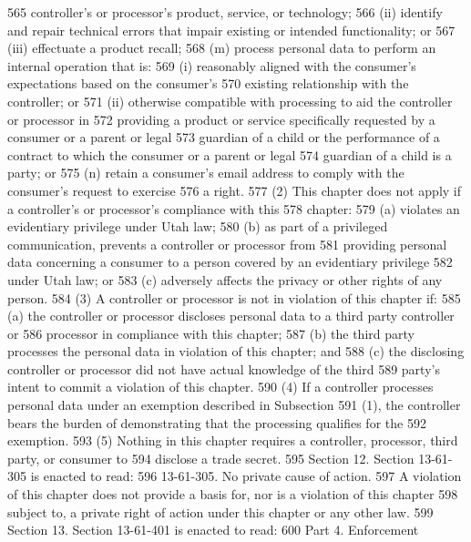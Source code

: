 565     controller's or processor's product, service, or technology;
566          (ii) identify and repair technical errors that impair existing or intended functionality; or
567          (iii) effectuate a product recall;
568          (m) process personal data to perform an internal operation that is:
569          (i) reasonably aligned with the consumer's expectations based on the consumer's
570     existing relationship with the controller; or
571          (ii) otherwise compatible with processing to aid the controller or processor in
572     providing a product or service specifically requested by a consumer or a parent or legal
573     guardian of a child or the performance of a contract to which the consumer or a parent or legal
574     guardian of a child is a party; or
575          (n) retain a consumer's email address to comply with the consumer's request to exercise
576     a right.
577          (2) This chapter does not apply if a controller's or processor's compliance with this
578     chapter:
579          (a) violates an evidentiary privilege under Utah law;
580          (b) as part of a privileged communication, prevents a controller or processor from
581     providing personal data concerning a consumer to a person covered by an evidentiary privilege
582     under Utah law; or
583          (c) adversely affects the privacy or other rights of any person.
584          (3) A controller or processor is not in violation of this chapter if:
585          (a) the controller or processor discloses personal data to a third party controller or
586     processor in compliance with this chapter;
587          (b) the third party processes the personal data in violation of this chapter; and
588          (c) the disclosing controller or processor did not have actual knowledge of the third
589     party's intent to commit a violation of this chapter.
590          (4) If a controller processes personal data under an exemption described in Subsection
591     (1), the controller bears the burden of demonstrating that the processing qualifies for the
592     exemption.
593          (5) Nothing in this chapter requires a controller, processor, third party, or consumer to
594     disclose a trade secret.
595          Section 12. Section 13-61-305 is enacted to read:
596          13-61-305. No private cause of action.
597          A violation of this chapter does not provide a basis for, nor is a violation of this chapter
598     subject to, a private right of action under this chapter or any other law.
599          Section 13. Section 13-61-401 is enacted to read:
600     
Part 4. Enforcement

